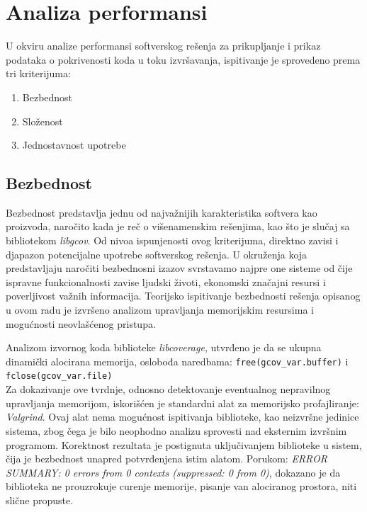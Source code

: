 \documentclass[12pt,oneside]{memoir}
\newcommand{\kod}[1]{\texttt{#1}}
\newcommand{\strano}[1]{\textit{#1}}
\begin{document}
\section{Analiza performansi}

U okviru analize performansi softverskog rešenja za prikupljanje i prikaz podataka o pokrivenosti koda u toku izvršavanja, ispitivanje je sprovedeno prema tri kriterijuma:
\begin{enumerate}
\item Bezbednost
\item Složenost
\item Jednostavnost upotrebe
\end{enumerate}

\subsection{Bezbednost}

Bezbednost predstavlja jednu od najvažnijih karakteristika softvera kao proizvoda, naročito kada je reč o višenamenskim rešenjima, kao što je slučaj sa bibliotekom \strano{libgcov}. Od nivoa ispunjenosti ovog kriterijuma, direktno zavisi i djapazon potencijalne upotrebe softverskog rešenja. U okruženja koja predstavljaju naročiti bezbednosni izazov svrstavamo najpre one sisteme od čije ispravne funkcionalnosti zavise ljudski životi, ekonomski značajni resursi i poverljivost važnih informacija. Teorijsko ispitivanje bezbednosti rešenja opisanog u ovom radu je izvršeno analizom upravljanja memorijskim resursima i mogućnosti neovlašćenog pristupa. 

Analizom izvornog koda biblioteke \strano{libcoverage}, utvrđeno je da se ukupna dinamički alocirana memorija, oslobođa naredbama: \kod{free(gcov\_var.buffer)} i \\ \kod{fclose(gcov\_var.file)} \\
Za dokazivanje ove tvrdnje, odnosno detektovanje eventualnog nepravilnog upravljanja memorijom, iskorišćen je standardni alat za memorijsko profajliranje: \strano{Valgrind}. Ovaj alat nema mogućnost ispitivanja biblioteke, kao neizvršne jedinice sistema, zbog čega je bilo neophodno analizu sprovesti nad eksternim izvršnim programom. Korektnost rezultata je postignuta uključivanjem biblioteke u sistem, čija je bezbednost unapred potvrđenjena istim alatom. Porukom: \strano{ERROR SUMMARY: 0 errors from 0 contexts (suppressed: 0 from 0)}, dokazano je da biblioteka ne prouzrokuje curenje memorije, pisanje van alociranog prostora, niti slične propuste. 
\end{document}
